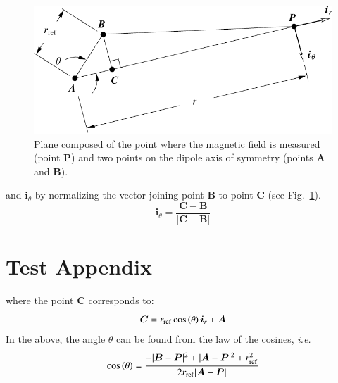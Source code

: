 \documentclass[oneside,10pt,onecolumn]{waflreport}
\newlength\lengthfigure                  %
\renewcommand{\vec}[1]{\bm{#1}}
\newcommand{\ie}{{\it i.e.}}
\begin{document}
%
%
\begin{figure}
   \center
   \includegraphics[width=4.0\lengthfigure]{dipoleplane.pdf}
\caption{Plane composed of the point where the magnetic field is measured (point ${\vec{P}}$)
         and two points on the dipole axis of symmetry (points $\vec{{A}}$ and ${\vec{B}}$).}
\label{fig:dipoleplane}
\end{figure}
%
and $\vec{i}_\theta$ by normalizing
the vector joining point {$ \vec{B}$} to point {$ \vec{C}$} (see Fig.\ \ref{fig:dipoleplane}).
%
\begin{equation}
\vec{i}_\theta=\frac{\vec{C}-\vec{B}}{|\vec{C}-\vec{B}|}
\end{equation}
%

\appendix
\section{Test Appendix}

where the point $\vec{C}$ corresponds to:
%
\begin{equation}
\vec{C}=r_{\rm ref} \cos \left( \theta \right) \vec{i}_r + \vec{A}
\end{equation}
%
In the above, the angle $\theta$ can be found from the law of the cosines, \ie\
%
\begin{equation}
     \cos \left( \theta \right)=
       \frac{-|\vec{B}-\vec{P}|^2 + |\vec{A}-\vec{P}|^2 + r_{\rm ref}^2}{2 r_{\rm ref}|\vec{A}-\vec{P}|}
\end{equation}
%






\end{document}
